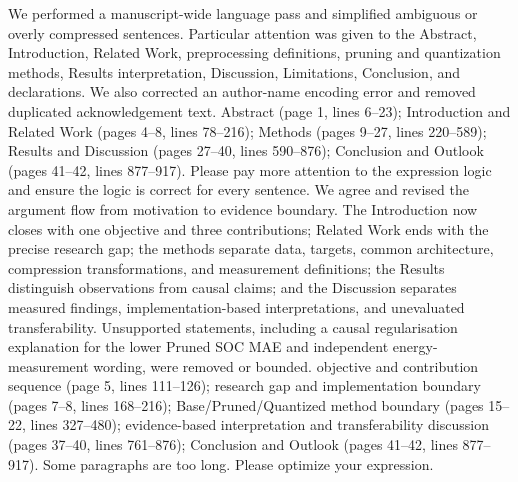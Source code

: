 {} We performed a manuscript-wide language pass and simplified ambiguous or overly compressed sentences. Particular attention was given to the Abstract, Introduction, Related Work, preprocessing definitions, pruning and quantization methods, Results interpretation, Discussion, Limitations, Conclusion, and declarations. We also corrected an author-name encoding error and removed duplicated acknowledgement text.\markdownRendererParagraphSeparator
{} Abstract (page 1, lines 6--23); Introduction and Related Work (pages 4--8, lines 78--216); Methods (pages 9--27, lines 220--589); Results and Discussion (pages 27--40, lines 590--876); Conclusion and Outlook (pages 41--42, lines 877--917).\markdownRendererInterblockSeparator
{}
\markdownRendererSectionEnd \markdownRendererSectionBegin
{}\markdownRendererInterblockSeparator
{}\markdownRendererBlockQuoteBegin
Please pay more attention to the expression logic and ensure the logic is correct for every sentence.\markdownRendererBlockQuoteEnd \markdownRendererInterblockSeparator
{} We agree and revised the argument flow from motivation to evidence boundary. The Introduction now closes with one objective and three contributions; Related Work ends with the precise research gap; the methods separate data, targets, common architecture, compression transformations, and measurement definitions; the Results distinguish observations from causal claims; and the Discussion separates measured findings, implementation-based interpretations, and unevaluated transferability. Unsupported statements, including a causal regularisation explanation for the lower Pruned SOC MAE and independent energy-measurement wording, were removed or bounded.\markdownRendererParagraphSeparator
{} objective and contribution sequence (page 5, lines 111--126); research gap and implementation boundary (pages 7--8, lines 168--216); Base/Pruned/Quantized method boundary (pages 15--22, lines 327--480); evidence-based interpretation and transferability discussion (pages 37--40, lines 761--876); Conclusion and Outlook (pages 41--42, lines 877--917).\markdownRendererInterblockSeparator
{}
\markdownRendererSectionEnd \markdownRendererSectionBegin
{}\markdownRendererInterblockSeparator
{}\markdownRendererBlockQuoteBegin
Some paragraphs are too long. Please optimize your expression.\markdownRendererBlockQuoteEnd \markdownRendererInterblockSeparator
